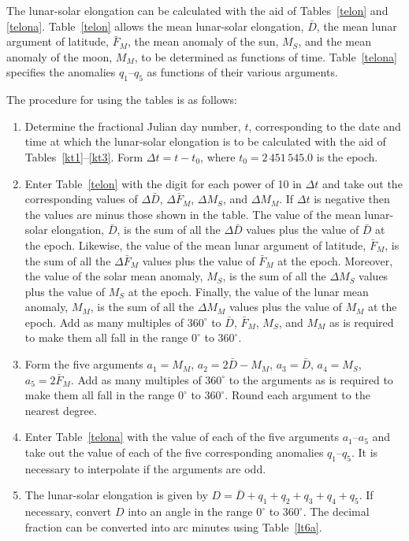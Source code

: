 The lunar-solar elongation can be calculated with the aid of Tables~\ref{telon} and \ref{telona}.
Table~\ref{telon} allows the mean lunar-solar elongation, $\bar{D}$, the mean lunar
argument of latitude, $\bar{F}_M$, the mean anomaly of the sun, $M_S$,
and the mean anomaly of the moon, $M_M$, to be determined as functions of time.
Table~\ref{telona} specifies the anomalies $q_1$--$q_5$ as functions of their
various arguments.

The procedure for using the tables is as follows:
\begin{enumerate}
 \item Determine the fractional Julian day number, $t$, corresponding to the date and time
at which the lunar-solar elongation is to be calculated with the aid of Tables~\ref{kt1}--\ref{kt3}. Form $\Delta t = t-t_0$, where $t_0=2\,451\,545.0$ is the epoch. 
\item Enter Table~\ref{telon} with the digit for each power of 10
in ${\Delta} t$ and take out the corresponding values of $\Delta \bar{D}$, $\Delta \bar{F}_M$,
 $\Delta M_S$, and $\Delta M_M$. If $\Delta t$ is negative then the 
values are minus those shown in the table.
The value of the mean lunar-solar elongation, $\bar{D}$, is the
sum of all the $\Delta\bar{D}$ values plus the value of $\bar{D}$ at the epoch.
Likewise, the value of the mean lunar argument of latitude, $\bar{F}_M$, is the
sum of all the $\Delta\bar{F}_M$ values plus the value of $\bar{F}_M$ at the epoch. Moreover, the value of the solar mean  anomaly, $M_S$, is
the sum of all the $\Delta M_S$ values plus the value of $M_S$ at the epoch. Finally, the value
of the lunar mean anomaly, $M_M$, is the
sum of all the $\Delta M_M$ values plus the value of $M_M$ at the epoch. 
Add as many multiples of $360^\circ$ to $\bar{D}$, $\bar{F}_M$, $M_S$, and $M_M$
as is required to make them all fall in the range $0^\circ$ to $360^\circ$. 
\item Form the five arguments $a_1=M_M$, $a_2=2\bar{D} - M_M$, $a_3=\bar{D}$, $a_4 = M_S$, $a_5=2\bar{F}_M$. Add as
many multiples of $360^\circ$ to the arguments as is required to make them all fall in the range
$0^\circ$ to $360^\circ$. Round each argument to the nearest degree.
\item Enter Table~\ref{telona} with the value of each of the five arguments $a_1$--$a_5$ and take out the
value of each of the five corresponding anomalies $q_1$--$q_5$. It is necessary to interpolate if the arguments are odd.
\item The lunar-solar elongation is given by $D=\bar{D} + q_1+q_2+q_3+q_4+q_5$.
If necessary, convert $D$ into an angle in the range $0^\circ$ to $360^\circ$. 
The decimal fraction can be converted into arc minutes
using Table~\ref{lt6a}. 
\end{enumerate}

